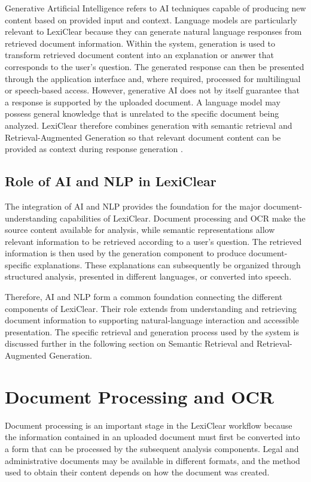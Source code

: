 \documentclass[12pt,a4paper,oneside]{report}
\begin{document}
Generative Artificial Intelligence refers to AI techniques capable of
producing new content based on provided input and context. Language models
are particularly relevant to LexiClear because they can generate natural
language responses from retrieved document information. Within the system, generation is used to transform retrieved document
content into an explanation or answer that corresponds to the user's
question. The generated response can then be presented through the
application interface and, where required, processed for multilingual or
speech-based access. However, generative AI does not by itself guarantee that a response is
supported by the uploaded document. A language model may possess general
knowledge that is unrelated to the specific document being analyzed.
LexiClear therefore combines generation with semantic retrieval and
Retrieval-Augmented Generation so that relevant document content can be
provided as context during response generation \cite{basha2024,lewis2020rag}.

\subsection{Role of AI and NLP in LexiClear}

The integration of AI and NLP provides the foundation for the major
document-understanding capabilities of LexiClear. Document processing and
OCR make the source content available for analysis, while semantic
representations allow relevant information to be retrieved according to a
user's question. The retrieved information is then used by the generation component to
produce document-specific explanations. These explanations can subsequently
be organized through structured analysis, presented in different languages,
or converted into speech.

Therefore, AI and NLP form a common foundation connecting the different
components of LexiClear. Their role extends from understanding and retrieving
document information to supporting natural-language interaction and
accessible presentation. The specific retrieval and generation process used
by the system is discussed further in the following section on Semantic
Retrieval and Retrieval-Augmented Generation.

\section{Document Processing and OCR}

Document processing is an important stage in the LexiClear workflow because
the information contained in an uploaded document must first be converted
into a form that can be processed by the subsequent analysis components.
Legal and administrative documents may be available in different formats,
and the method used to obtain their content depends on how the document was
created.
\end{document}
